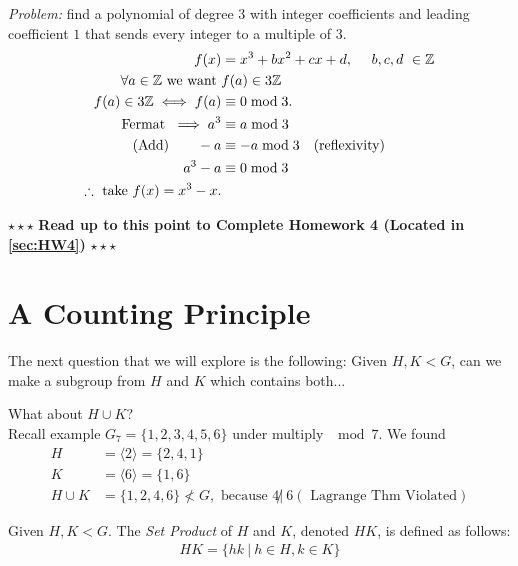 \begin{example}
\textit{Problem:} find a polynomial of degree $3$ with integer coefficients and leading coefficient
$1$ that sends every integer to a multiple of 3.
\begin{align}
    f(x)&=x^3+bx^2+cx+d, \ \ \ \ b,c,d \ \in \Z \nonumber \\
    \forall a \in \Z \text{ we want } &f(a)\in 3\Z \nonumber \\
    f(a)\in 3\Z \iff f(a)&\equiv 0 \mod 3. \nonumber \\
    \text{Fermat } \implies a^3&\equiv a \mod 3  \nonumber \\
    \text{ (Add) }\ \ \ \ \ -a&\equiv -a\mod 3 \ \ \ \text{(reflexivity)}  \nonumber \\
    a^3-a&\equiv 0 \mod 3 \nonumber \\
    \therefore \text{ take } f(x)= x^3 - x. \nonumber
\end{align}
\end{example}
\steezybreak
\begin{tcolorbox}
\begin{center}
    $\star\star\star$ \textbf{Read up to this point to Complete Homework 4 (Located in
    \ref{sec:HW4})} $\star\star\star$
\end{center}
\end{tcolorbox}
\newpage
\section{A Counting Principle}
The next question that we will explore is the following: Given $H,K < G$, can we make a subgroup
from $H$ and $K$ which contains both...\steezybreak

\noindent What about $H\cup K$? \\
Recall example $G_7=\{1,2,3,4,5,6\}$ under multiply $\mod 7$. We found
\begin{align}
    H&=\langle 2 \rangle = \{2,4,1\} \nonumber \\
    K&=\langle 6 \rangle = \{1,6 \} \nonumber \\
    H\cup K &= \{1,2,4,6\} \not < G, \text{ because } 4 \not | \ 6 (\text{ Lagrange Thm Violated}) \nonumber
\end{align}

\begin{definition}
Given $H,K < G$. The \textit{Set Product} of $H$ and $K$, denoted $HK$, is defined as follows:\\
\begin{align}
HK = \{hk \ | \ h\in H,k\in K\} \nonumber
\end{align}
\end{definition}

